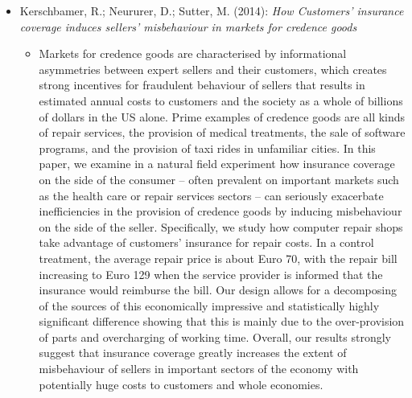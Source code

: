 \begin{itemize}
\begin{itemize}
		\end{itemize}
	\item Kerschbamer, R.; Neururer, D.; Sutter, M. (2014): \textit{How Customers' insurance coverage induces sellers' misbehaviour in markets for credence goods}
		\begin{itemize}
			\item Markets for credence goods are characterised by informational asymmetries between expert sellers and their customers, which creates strong incentives for fraudulent behaviour of sellers that results in estimated annual costs to customers and the society as a whole of billions of dollars in the US alone. Prime examples of credence goods are all kinds of repair services, the provision of medical treatments, the sale of software programs, and the provision of taxi rides in unfamiliar cities. In this paper, we examine in a natural field experiment how insurance coverage on the side of the consumer – often prevalent on important markets such as the health care or repair services sectors – can seriously exacerbate inefficiencies in the provision of credence goods by inducing misbehaviour on the side of the seller. Specifically, we study how computer repair shops take advantage of customers’ insurance for repair costs. In a control treatment, the average repair price is about Euro 70, with the repair bill increasing to Euro 129 when the service provider is informed that the insurance would reimburse the bill. Our design allows for a decomposing of the sources of this economically impressive and statistically highly significant difference showing that this is mainly due to the over-provision of parts and overcharging of working time. Overall, our results strongly suggest that insurance coverage greatly increases the extent of misbehaviour of sellers in important sectors of the economy with potentially huge costs to customers and whole economies.
		\end{itemize}
\end{itemize}

\newpage